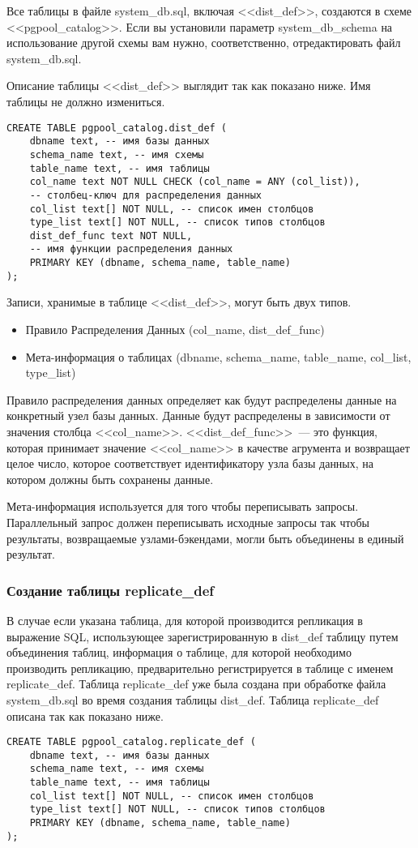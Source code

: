 Все таблицы в файле system\_db.sql, включая <<dist\_def>>, создаются в схеме <<pgpool\_catalog>>. Если вы установили 
параметр system\_db\_schema на использование другой схемы вам нужно, соответственно, отредактировать файл system\_db.sql.

Описание таблицы <<dist\_def>> выглядит так как показано ниже. Имя таблицы не должно измениться.
\begin{verbatim}
CREATE TABLE pgpool_catalog.dist_def (
    dbname text, -- имя базы данных
    schema_name text, -- имя схемы
    table_name text, -- имя таблицы
    col_name text NOT NULL CHECK (col_name = ANY (col_list)), 
    -- столбец-ключ для распределения данных
    col_list text[] NOT NULL, -- список имен столбцов
    type_list text[] NOT NULL, -- список типов столбцов
    dist_def_func text NOT NULL, 
    -- имя функции распределения данных
    PRIMARY KEY (dbname, schema_name, table_name)
);
\end{verbatim}

Записи, хранимые в таблице <<dist\_def>>, могут быть двух типов.
\begin{itemize}
\item Правило Распределения Данных (col\_name, dist\_def\_func)
\item Мета-информация о таблицах (dbname, schema\_name, table\_name, col\_list, type\_list)
\end{itemize}

Правило распределения данных определяет как будут распределены данные на конкретный узел базы данных. Данные будут 
распределены в зависимости от значения столбца <<col\_name>>. <<dist\_def\_func>>~--- это функция, которая принимает 
значение <<col\_name>> в качестве агрумента и возвращает целое число, которое соответствует идентификатору узла 
базы данных, на котором должны быть сохранены данные.

Мета-информация используется для того чтобы переписывать запросы. Параллельный запрос должен переписывать исходные запросы 
так чтобы результаты, возвращаемые узлами-бэкендами, могли быть объединены в единый результат.


\subsubsection{Создание таблицы replicate\_def}
В случае если указана таблица, для которой производится репликация в выражение SQL, использующее зарегистрированную в 
dist\_def таблицу путем объединения таблиц, информация о таблице, для которой необходимо производить репликацию, 
предварительно регистрируется в таблице с именем replicate\_def. Таблица replicate\_def уже была создана при обработке
файла system\_db.sql во время создания таблицы dist\_def. Таблица replicate\_def описана так как показано ниже.
\begin{verbatim}
CREATE TABLE pgpool_catalog.replicate_def (
    dbname text, -- имя базы данных
    schema_name text, -- имя схемы
    table_name text, -- имя таблицы
    col_list text[] NOT NULL, -- список имен столбцов
    type_list text[] NOT NULL, -- список типов столбцов
    PRIMARY KEY (dbname, schema_name, table_name)
);
\end{verbatim}


